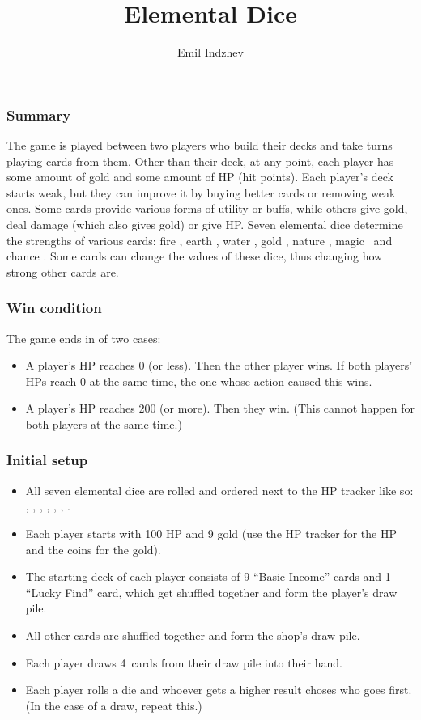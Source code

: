\documentclass[dvipsnames,parskip,a4paper]{scrartcl}
\title{Elemental Dice}
\author{Emil Indzhev}
\newcommand{\iconsize}{3.4mm}
\newcommand{\icondepth}{0.45mm}
\newcommand{\icon}[1]{\raisebox{-\icondepth}{\texttt{[image:  \#1 ]}}}
\newcommand{\fire}{\icon{icons/fire.png}}
\newcommand{\earth}{\icon{icons/earth.png}}
\newcommand{\water}{\icon{icons/water.png}}
\newcommand{\nature}{\icon{icons/nature.png}}
\newcommand{\magic}{\icon{icons/magic.png}}
\newcommand{\gold}{\icon{icons/gold.png}}
\newcommand{\chance}{\icon{icons/chance.png}}
\newcommand{\handsize}{4}
\begin{document}
\maketitle

\subsubsection*{Summary}

The game is played between two players who build their decks and take turns playing cards from them. Other than their deck, at any point, each player has some amount of gold and some amount of HP (hit points). Each player's deck starts weak, but they can improve it by buying better cards or removing weak ones. Some cards provide various forms of utility or buffs, while others give gold, deal damage (which also gives gold) or give HP. Seven elemental dice determine the strengths of various cards: fire \fire, earth \earth, water \water, gold \gold, nature \nature, magic \magic \ and chance \chance. Some cards can change the values of these dice, thus changing how strong other cards are.

\subsubsection*{Win condition}

The game ends in of two cases:

\begin{itemize}
\item A player's HP reaches 0 (or less). Then the other player wins. If both players' HPs reach 0 at the same time, the one whose action caused this wins.
\item A player's HP reaches 200 (or more). Then they win. (This cannot happen for both players at the same time.)
\end{itemize}

\subsubsection*{Initial setup}

\begin{itemize}
\item All seven elemental dice are rolled and ordered next to the HP tracker like so: \fire, \earth, \water, \gold, \nature, \magic, \chance.
\item Each player starts with 100 HP and 9 gold (use the HP tracker for the HP and the coins for the gold).
\item The starting deck of each player consists of 9 ``Basic Income'' cards and 1 ``Lucky Find'' card, which get shuffled together and form the player's draw pile.
\item All other cards are shuffled together and form the shop's draw pile.
\item Each player draws \handsize \ cards from their draw pile into their hand.
\item Each player rolls a die and whoever gets a higher result choses who goes first. (In the case of a draw, repeat this.)
\end{itemize}
\end{document}
